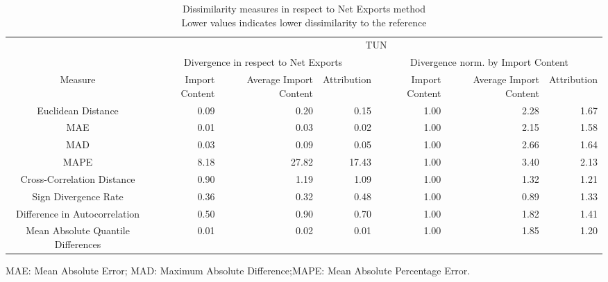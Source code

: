 \begin{table}[t]
\caption*{
{\large Dissimilarity measures in respect to Net Exports method} \\ 
{\small Lower values indicates lower dissimilarity to the reference}
} 
\fontsize{15.0pt}{18.0pt}\selectfont
\begin{tabular*}{\linewidth}{@{\extracolsep{\fill}}crrrrrr}
\toprule
 & \multicolumn{6}{c}{TUN} \\ 
\cmidrule(lr){2-7}
 & \multicolumn{3}{c}{Divergence in respect to Net Exports} & \multicolumn{3}{c}{Divergence norm. by Import Content} \\ 
\cmidrule(lr){2-4} \cmidrule(lr){5-7}
Measure & Import Content & Average Import Content & Attribution & Import Content & Average Import Content & Attribution \\ 
\midrule\addlinespace[2.5pt]
Euclidean Distance & 0.09 & 0.20 & 0.15 & 1.00 & 2.28 & 1.67 \\ 
MAE & 0.01 & 0.03 & 0.02 & 1.00 & 2.15 & 1.58 \\ 
MAD & 0.03 & 0.09 & 0.05 & 1.00 & 2.66 & 1.64 \\ 
MAPE & 8.18 & 27.82 & 17.43 & 1.00 & 3.40 & 2.13 \\ 
Cross-Correlation Distance & 0.90 & 1.19 & 1.09 & 1.00 & 1.32 & 1.21 \\ 
Sign Divergence Rate & 0.36 & 0.32 & 0.48 & 1.00 & 0.89 & 1.33 \\ 
Difference in Autocorrelation & 0.50 & 0.90 & 0.70 & 1.00 & 1.82 & 1.41 \\ 
Mean Absolute Quantile Differences & 0.01 & 0.02 & 0.01 & 1.00 & 1.85 & 1.20 \\ 
\bottomrule
\end{tabular*}
\begin{minipage}{\linewidth}
MAE: Mean Absolute Error; MAD: Maximum Absolute Difference;MAPE: Mean Absolute Percentage Error.\\
\end{minipage}
\end{table}

